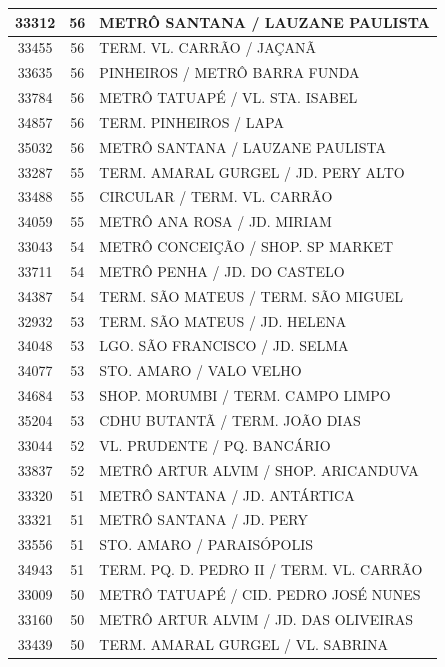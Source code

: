 \documentclass[
	12pt,				%
	oneside,			%
	a4paper,			%
	english,			%
	brazil				%
	]{abntex2ppgsi}
\begin{document}
\begin{apendicesenv}
\begin{longtable}{c|c|p{7cm}}
\hline
    33312 & 56    & METRÔ SANTANA / LAUZANE PAULISTA \\
\hline
    33455 & 56    & TERM. VL. CARRÃO / JAÇANÃ \\
\hline
    33635 & 56    & PINHEIROS / METRÔ BARRA FUNDA \\
\hline
    33784 & 56    & METRÔ TATUAPÉ / VL. STA. ISABEL \\
\hline
    34857 & 56    & TERM. PINHEIROS / LAPA \\
\hline
    35032 & 56    & METRÔ SANTANA / LAUZANE PAULISTA \\
\hline
    33287 & 55    & TERM. AMARAL GURGEL / JD. PERY ALTO \\
\hline
    33488 & 55    & CIRCULAR / TERM. VL. CARRÃO \\
\hline
    34059 & 55    & METRÔ ANA ROSA / JD. MIRIAM \\
\hline
    33043 & 54    & METRÔ CONCEIÇÃO / SHOP. SP MARKET \\
\hline
    33711 & 54    & METRÔ PENHA / JD. DO CASTELO \\
\hline
    34387 & 54    & TERM. SÃO MATEUS / TERM. SÃO MIGUEL \\
\hline
    32932 & 53    & TERM. SÃO MATEUS / JD. HELENA \\
\hline
    34048 & 53    & LGO. SÃO FRANCISCO / JD. SELMA \\
\hline
    34077 & 53    & STO. AMARO / VALO VELHO \\
\hline
    34684 & 53    & SHOP. MORUMBI / TERM. CAMPO LIMPO \\
\hline
    35204 & 53    & CDHU BUTANTÃ / TERM. JOÃO DIAS \\
\hline
    33044 & 52    & VL. PRUDENTE / PQ. BANCÁRIO \\
\hline
    33837 & 52    & METRÔ ARTUR ALVIM / SHOP. ARICANDUVA \\
\hline
    33320 & 51    & METRÔ SANTANA / JD. ANTÁRTICA \\
\hline
    33321 & 51    & METRÔ SANTANA / JD. PERY \\
\hline
    33556 & 51    & STO. AMARO / PARAISÓPOLIS \\
\hline
    34943 & 51    & TERM. PQ. D. PEDRO II / TERM. VL. CARRÃO \\
\hline
    33009 & 50    & METRÔ TATUAPÉ / CID. PEDRO JOSÉ NUNES \\
\hline
    33160 & 50    & METRÔ ARTUR ALVIM / JD. DAS OLIVEIRAS \\
\hline
    33439 & 50    & TERM. AMARAL GURGEL / VL. SABRINA \\

\end{longtable}
\end{apendicesenv}
\end{document}
